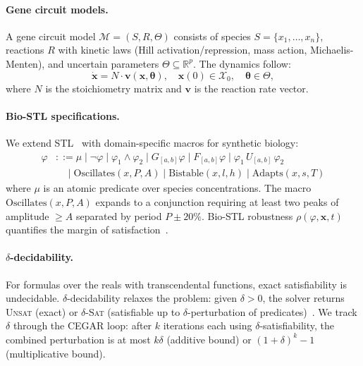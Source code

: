 \documentclass[11pt]{article}
\newcommand{\cegar}{\textsc{CEGAR}}
\newcommand{\stl}{\textsc{STL}}
\newcommand{\RR}{\mathbb{R}}
\begin{document}
\paragraph{Gene circuit models.}
A gene circuit model $\mathcal{M} = (S, R, \Theta)$ consists of
species $S = \{x_1, \ldots, x_n\}$, reactions $R$ with kinetic laws
(Hill activation/repression, mass action, Michaelis-Menten), and
uncertain parameters $\Theta \subseteq \RR^p$. The dynamics follow:
\begin{equation}
  \dot{\mathbf{x}} = N \cdot \mathbf{v}(\mathbf{x}, \boldsymbol\theta),
  \quad \mathbf{x}(0) \in \mathcal{X}_0, \quad \boldsymbol\theta \in \Theta,
\end{equation}
where $N$ is the stoichiometry matrix and $\mathbf{v}$ is the reaction
rate vector.

\paragraph{Bio-STL specifications.}
We extend \stl{}~\cite{maler2004monitoring} with domain-specific
macros for synthetic biology:
\begin{align*}
  \varphi &::= \mu \mid \neg\varphi \mid \varphi_1 \land \varphi_2
           \mid G_{[a,b]}\varphi \mid F_{[a,b]}\varphi
           \mid \varphi_1\,U_{[a,b]}\,\varphi_2 \\
  &\quad\mid \text{Oscillates}(x, P, A) \mid \text{Bistable}(x, l, h)
   \mid \text{Adapts}(x, s, T)
\end{align*}
where $\mu$ is an atomic predicate over species concentrations. The
macro $\text{Oscillates}(x,P,A)$ expands to a conjunction requiring
at least two peaks of amplitude $\geq A$ separated by period
$P \pm 20\%$. Bio-STL robustness $\rho(\varphi, \mathbf{x}, t)$
quantifies the margin of satisfaction~\cite{donze2013efficient}.

\paragraph{$\delta$-decidability.}
For formulas over the reals with transcendental functions,
exact satisfiability is undecidable. $\delta$-decidability
relaxes the problem: given $\delta > 0$, the solver returns
\textsc{Unsat} (exact) or $\delta$\textsc{-Sat} (satisfiable up to
$\delta$-perturbation of predicates)~\cite{gao2013dreal}. We track
$\delta$ through the \cegar{} loop: after $k$ iterations each using
$\delta$-satisfiability, the combined perturbation is at most
$k\delta$ (additive bound) or $(1+\delta)^k - 1$ (multiplicative
bound).
\end{document}
